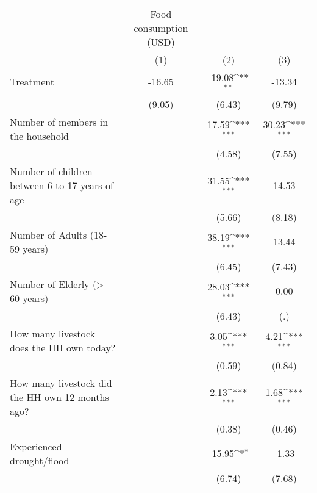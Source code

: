 {
\def\sym#1{\ifmmode^{#1}\else\(^{#1}\)\fi}
\begin{tabular}{l*{3}{c}}
\hline\hline
                    &Food consumption (USD)                                           \\
                    &\multicolumn{1}{c}{(1)}         &\multicolumn{1}{c}{(2)}         &\multicolumn{1}{c}{(3)}         \\
\hline
Treatment           &      -16.65         &      -19.08\sym{**} &      -13.34         \\
                    &      (9.05)         &      (6.43)         &      (9.79)         \\
[1em]
Number of members in the household&                     &       17.59\sym{***}&       30.23\sym{***}\\
                    &                     &      (4.58)         &      (7.55)         \\
[1em]
Number of children between 6 to 17 years of age&                     &       31.55\sym{***}&       14.53         \\
                    &                     &      (5.66)         &      (8.18)         \\
[1em]
Number of Adults (18-59 years)&                     &       38.19\sym{***}&       13.44         \\
                    &                     &      (6.45)         &      (7.43)         \\
[1em]
Number of Elderly (> 60 years)&                     &       28.03\sym{***}&        0.00         \\
                    &                     &      (6.43)         &         (.)         \\
[1em]
How many livestock does the HH own today?&                     &        3.05\sym{***}&        4.21\sym{***}\\
                    &                     &      (0.59)         &      (0.84)         \\
[1em]
How many livestock did the HH own 12 months ago?&                     &        2.13\sym{***}&        1.68\sym{***}\\
                    &                     &      (0.38)         &      (0.46)         \\
[1em]
Experienced drought/flood&                     &      -15.95\sym{*}  &       -1.33         \\
                    &                     &      (6.74)         &      (7.68)         \\

\end{tabular}}
